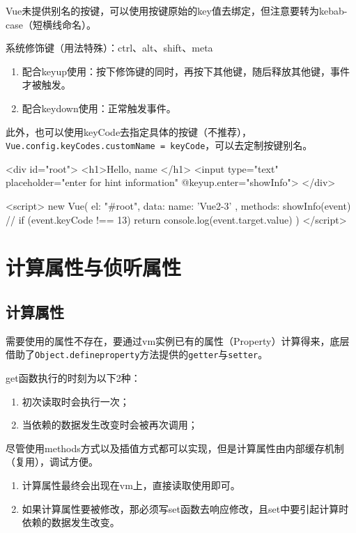 Vue未提供别名的按键，可以使用按键原始的key值去绑定，但注意要转为kebab-case（短横线命名）。

系统修饰键（用法特殊）：ctrl、alt、shift、meta
\begin{enumerate}
    \item 配合keyup使用：按下修饰键的同时，再按下其他键，随后释放其他键，事件才被触发。
    \item 配合keydown使用：正常触发事件。
\end{enumerate}

此外，也可以使用keyCode去指定具体的按键（不推荐），\verb|Vue.config.keyCodes.customName = keyCode|，可以去定制按键别名。

\begin{html}
<div id="root">
    <h1>Hello, {{ name }}</h1>
    <input type="text" placeholder="enter for hint information" @keyup.enter="showInfo">
</div>
\end{html}

\begin{html}
<script>
    new Vue({
        el: "#root",
        data: {
            name: 'Vue2-3'
        },
        methods: {
            showInfo(event) {
                // if (event.keyCode !== 13) return
                console.log(event.target.value)
            }
        }
    })
</script>
\end{html}
\section{计算属性与侦听属性}
\subsection{计算属性}
需要使用的属性不存在，要通过vm实例已有的属性（Property）计算得来，底层借助了\verb|Object.defineproperty|方法提供的\verb|getter|与\verb|setter|。

get函数执行的时刻为以下2种：
\begin{enumerate}
    \item 初次读取时会执行一次；
    \item 当依赖的数据发生改变时会被再次调用；
\end{enumerate}

尽管使用methods方式以及插值方式都可以实现，但是计算属性由内部缓存机制（复用），调试方便。

\begin{enumerate}
    \item 计算属性最终会出现在vm上，直接读取使用即可。
    \item 如果计算属性要被修改，那必须写set函数去响应修改，且set中要引起计算时依赖的数据发生改变。
\end{enumerate}

